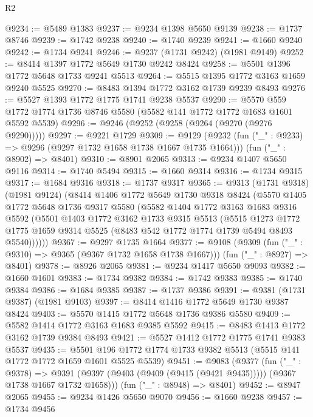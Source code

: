 \begin{lexlean}{R2}
\begin{coremodule}
@9234 := @5489 @1383
@9237 := @9234 @1398 @5650 @9139
@9238 := @1737 @8746
@9239 := @1742 @9238
@9240 := @1740 @9239
@9241 := @1660 @9240
@9242 := @1734 @9241
@9246 := @9237 (@1731 @9242) (@1981 @9149)
@9252 := @8414 @1397 @1772 @5649 @1730 @9242 @8424
@9258 := @5501 @1396 @1772 @5648 @1733 @9241 @5513
@9264 := @5515 @1395 @1772 @3163 @1659 @9240 @5525
@9270 := @8483 @1394 @1772 @3162 @1739 @9239 @8493
@9276 := @5527 @1393 @1772 @1775 @1741 @9238 @5537
@9290 := @5570 @559 @1772 @1774 @1736 @8746 @5580 (@5582 @141 @1772 @1772 @1683 @1601 @5592 @5539)
@9296 := @9246 (@9252 (@9258 (@9264 (@9270 (@9276 @9290)))))
@9297 := @9221 @1729
@9309 := @9129
    (@9232 (fun ("_" : @9233) => @9296 (@9297 @1732 @1658 @1738 @1667 @1735 @1664)))
    (fun ("_" : @8902) => @8401)
@9310 := @8901 @2065
@9313 := @9234 @1407 @5650 @9116
@9314 := @1740 @5494
@9315 := @1660 @9314
@9316 := @1734 @9315
@9317 := @1684 @9316
@9318 := @1737 @9317
@9365 := @9313
    (@1731 @9318)
    (@1981 @9124)
    (@8414
      @1406
      @1772
      @5649
      @1730
      @9318
      @8424
      (@5570
        @1405
        @1772
        @5648
        @1736
        @9317
        @5580
        (@5582
          @1404
          @1772
          @3163
          @1683
          @9316
          @5592
          (@5501
            @1403
            @1772
            @3162
            @1733
            @9315
            @5513
            (@5515
              @1273
              @1772
              @1775
              @1659
              @9314
              @5525
              (@8483 @542 @1772 @1774 @1739 @5494 @8493 @5540))))))
@9367 := @9297 @1735 @1664
@9377 := @9108
    (@9309 (fun ("_" : @9310) => @9365 (@9367 @1732 @1658 @1738 @1667)))
    (fun ("_" : @8927) => @8401)
@9378 := @8926 @2065
@9381 := @9234 @1417 @5650 @9093
@9382 := @1660 @1601
@9383 := @1734 @9382
@9384 := @1742 @9383
@9385 := @1740 @9384
@9386 := @1684 @9385
@9387 := @1737 @9386
@9391 := @9381 (@1731 @9387) (@1981 @9103)
@9397 := @8414 @1416 @1772 @5649 @1730 @9387 @8424
@9403 := @5570 @1415 @1772 @5648 @1736 @9386 @5580
@9409 := @5582 @1414 @1772 @3163 @1683 @9385 @5592
@9415 := @8483 @1413 @1772 @3162 @1739 @9384 @8493
@9421 := @5527 @1412 @1772 @1775 @1741 @9383 @5537
@9435 := @5501 @196 @1772 @1774 @1733 @9382 @5513 (@5515 @141 @1772 @1772 @1659 @1601 @5525 @5539)
@9451 := @9083
    (@9377
      (fun ("_" : @9378) =>
      @9391 (@9397 (@9403 (@9409 (@9415 (@9421 @9435))))) (@9367 @1738 @1667 @1732 @1658)))
    (fun ("_" : @8948) => @8401)
@9452 := @8947 @2065
@9455 := @9234 @1426 @5650 @9070
@9456 := @1660 @9238
@9457 := @1734 @9456

\end{coremodule}
\end{lexlean}
